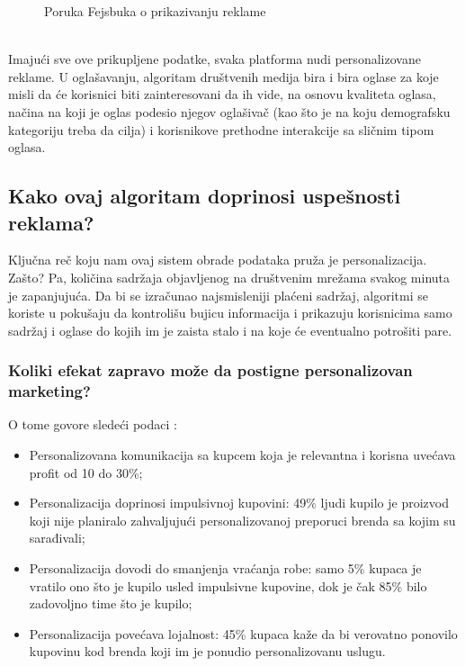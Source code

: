 \documentclass[a4paper]{article}
\begin{document}
{{\begin{figure}[h!]
\begin{center}
				\end{center}
				\caption{Poruka Fejsbuka o prikazivanju reklame}
				\label{fig:zastoreklama}
			\end{figure}\\
			Imajući sve ove prikupljene podatke, svaka platforma nudi personalizovane reklame.  U oglašavanju, algoritam društvenih medija bira i bira oglase za koje misli da će korisnici biti zainteresovani da ih vide, na osnovu kvaliteta oglasa, načina na koji je oglas podesio njegov 		oglašivač (kao što je na koju demografsku kategoriju treba da cilja) i korisnikove prethodne interakcije sa sličnim tipom oglasa.  \cite{algoritmi}
			
			\subsection{Kako ovaj algoritam doprinosi uspešnosti reklama?}
			\label{subsec:uspesnostreklama}
			Ključna reč koju nam ovaj sistem obrade podataka pruža je personalizacija. Zašto? Pa, količina sadržaja objavljenog na društvenim mrežama svakog minuta je zapanjujuća. Da bi se izračunao najsmisleniji plaćeni sadržaj, algoritmi se koriste u pokušaju da kontrolišu bujicu 		informacija i prikazuju korisnicima samo sadržaj i oglase do kojih im je zaista stalo i na koje će eventualno potrošiti pare.
			\subsubsection{Koliki efekat zapravo može da postigne personalizovan marketing?}
			O tome govore sledeći podaci \cite{statistikai}:
			\begin{itemize}
				\item Personalizovana komunikacija sa kupcem koja je relevantna i korisna uvećava profit od 10 do 30\%;
				\item Personalizacija doprinosi impulsivnoj kupovini: 49\% ljudi kupilo je proizvod koji nije planiralo zahvaljujući personalizovanoj preporuci brenda sa kojim su sarađivali;
				\item Personalizacija dovodi do smanjenja vraćanja robe: samo 5\% kupaca je vratilo ono što je kupilo usled impulsivne kupovine, dok je čak 85\% bilo zadovoljno time što je kupilo;
				\item Personalizacija povećava lojalnost: 45\% kupaca kaže da bi verovatno ponovilo kupovinu kod brenda koji im je ponudio personalizovanu uslugu.
			\end{itemize} 
			
}}
\end{document}
